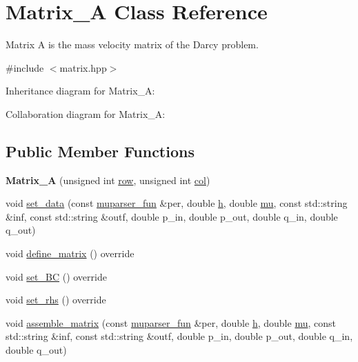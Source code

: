 \hypertarget{classMatrix__A}{}\section{Matrix\+\_\+A Class Reference}
\label{classMatrix__A}


Matrix A is the mass velocity matrix of the Darcy problem.  




{\ttfamily \#include $<$matrix.\+hpp$>$}



Inheritance diagram for Matrix\+\_\+A\+:


Collaboration diagram for Matrix\+\_\+A\+:
\subsection*{Public Member Functions}
\begin{DoxyCompactItemize}
\item 
\mbox{\label{classMatrix__A_aed3039186a3e37772d70bfebb0cf937c}} 
{\bfseries Matrix\+\_\+A} (unsigned int \hyperlink{classAbstractMatrix_a27fb46bf2853d4927d92a81b8b7773fb}{row}, unsigned int \hyperlink{classAbstractMatrix_af3ad3551ce094979488cef5df0e4fc1d}{col})
\item 
void \hyperlink{classMatrix__A_ad0a77ac1c6296a43f0ff240fe4c8af14}{set\+\_\+data} (const \hyperlink{classmuparser__fun}{muparser\+\_\+fun} \&per, double \hyperlink{classMatrix__A_a0478cbd42a0688d799c243c78fc591d2}{h}, double \hyperlink{classMatrix__A_a26bdcd4e2243970aa1b25ae6a6cb1cb3}{mu}, const std\+::string \&inf, const std\+::string \&outf, double p\+\_\+in, double p\+\_\+out, double q\+\_\+in, double q\+\_\+out)
\item 
void \hyperlink{classMatrix__A_aabd70de6bdf8e08a0a71c81b4c37554f}{define\+\_\+matrix} () override
\item 
void \hyperlink{classMatrix__A_aa6830348870aa5b7c6e99fb65dcb6b6e}{set\+\_\+\+BC} () override
\item 
void \hyperlink{classMatrix__A_a750e028c607aa3e4ac59db450aa43d2a}{set\+\_\+rhs} () override
\item 
void \hyperlink{classMatrix__A_abd0cec347889e699441ffd1e8b09ee5c}{assemble\+\_\+matrix} (const \hyperlink{classmuparser__fun}{muparser\+\_\+fun} \&per, double \hyperlink{classMatrix__A_a0478cbd42a0688d799c243c78fc591d2}{h}, double \hyperlink{classMatrix__A_a26bdcd4e2243970aa1b25ae6a6cb1cb3}{mu}, const std\+::string \&inf, const std\+::string \&outf, double p\+\_\+in, double p\+\_\+out, double q\+\_\+in, double q\+\_\+out)
\end{DoxyCompactItemize}
